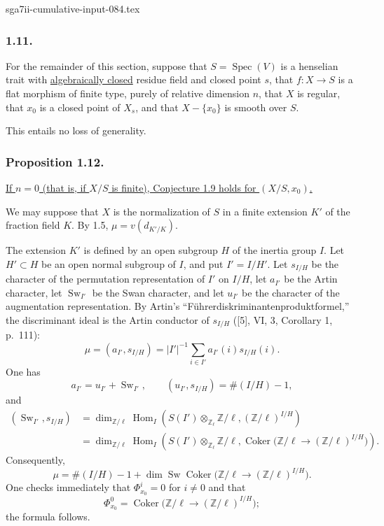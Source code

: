 \begin{filecontents*}{sga7ii-cumulative-input-084.tex}
\subsubsection*{1.11.}
For the remainder of this section, suppose that
$S=\operatorname{Spec}(V)$ is a henselian trait with
\underline{algebraically closed} residue field and closed point $s$,
that $f:X\to S$ is a flat morphism of finite type, purely of relative
dimension $n$, that $X$ is regular, that $x_0$ is a closed point of
$X_s$, and that $X-\{x_0\}$ is smooth over $S$.

This entails no loss of generality.

\subsubsection*{Proposition 1.12.}
\underline{If $n=0$ (that is, if $X/S$ is finite), Conjecture 1.9
holds for $(X/S,x_0)$.}

We may suppose that $X$ is the normalization of $S$ in a finite
extension $K'$ of the fraction field $K$.  By 1.5,
$\mu=v(d_{K'/K})$.

The extension $K'$ is defined by an open subgroup $H$ of the inertia
group $I$.  Let $H'\subset H$ be an open normal subgroup of $I$, and
put $I'=I/H'$.  Let $s_{I/H}$ be the character of the permutation
representation of $I'$ on $I/H$, let $a_{I'}$ be the Artin
character, let $\operatorname{Sw}_{I'}$ be the Swan character, and
let $u_{I'}$ be the character of the augmentation representation.
By Artin's ``F\"uhrerdiskriminantenproduktformel,'' the discriminant
ideal is the Artin conductor of $s_{I/H}$ ([5], VI, 3, Corollary 1,
p.~111):
\[
\mu=(a_{I'},s_{I/H})
=|I'|^{-1}\sum_{i\in I'}a_{I'}(i)s_{I/H}(i).
\]
One has
\[
a_{I'}=u_{I'}+\operatorname{Sw}_{I'},
\qquad
(u_{I'},s_{I/H})=\#(I/H)-1,
\]
and
\begin{align*}
(\operatorname{Sw}_{I'},s_{I/H})
&=\dim_{\mathbb Z/\ell}\operatorname{Hom}_I\!\left(
S(I')\otimes_{\mathbb Z_\ell}\mathbb Z/\ell,
(\mathbb Z/\ell)^{I/H}\right)\\
&=\dim_{\mathbb Z/\ell}\operatorname{Hom}_I\!\left(
S(I')\otimes_{\mathbb Z_\ell}\mathbb Z/\ell,
\operatorname{Coker}\bigl(
\mathbb Z/\ell\longrightarrow(\mathbb Z/\ell)^{I/H}\bigr)
\right).
\end{align*}
Consequently,
\[
\mu=\#(I/H)-1+
\dim\operatorname{Sw}\operatorname{Coker}\bigl(
\mathbb Z/\ell\longrightarrow(\mathbb Z/\ell)^{I/H}\bigr).
\]
One checks immediately that $\Phi^i_{x_0}=0$ for $i\ne0$ and that
\[
\Phi^0_{x_0}=\operatorname{Coker}\bigl(
\mathbb Z/\ell\longrightarrow(\mathbb Z/\ell)^{I/H}\bigr);
\]
the formula follows.
\end{filecontents*}
